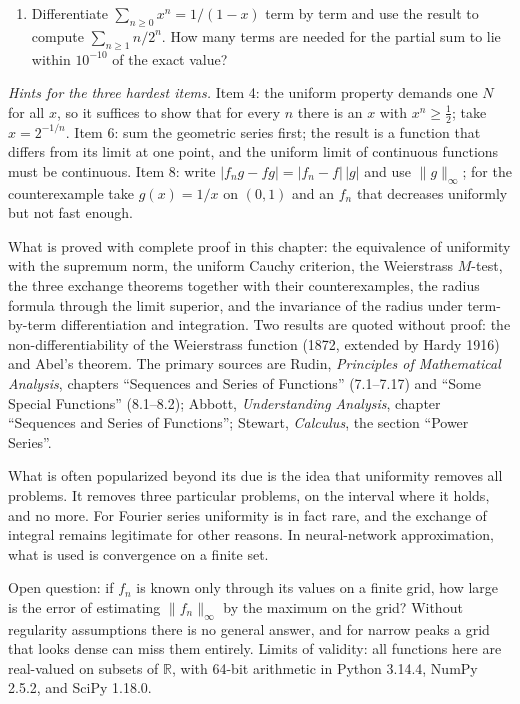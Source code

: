 \begin{latihan}
\begin{enumerate}
\item Differentiate $\sum_{n\ge0}x^n=1/(1-x)$ term by term and use the result
      to compute $\sum_{n\ge1}n/2^n$. How many terms are needed for the
      partial sum to lie within $10^{-10}$ of the exact value?
\end{enumerate}

\noindent\emph{Hints for the three hardest items.} Item 4: the uniform property
demands one $N$ for all $x$, so it suffices to show that for every $n$
there is an $x$ with $x^n\ge\tfrac12$; take $x=2^{-1/n}$. Item 6: sum the geometric
series first; the result is a function that differs from its limit at one point,
and the uniform limit of continuous functions must be continuous. Item 8: write
$|f_ng-fg|=|f_n-f|\,|g|$ and use $\|g\|_\infty$; for the counterexample
take $g(x)=1/x$ on $(0,1)$ and an $f_n$ that decreases uniformly but not
fast enough.
\end{latihan}

\begin{untukpeneliti}
What is proved with complete proof in this chapter: the equivalence of uniformity with the
supremum norm, the uniform Cauchy criterion, the Weierstrass $M$-test, the three exchange
theorems together with their counterexamples, the radius formula through the limit superior, and
the invariance of the radius under term-by-term differentiation and integration. Two results are
quoted without proof: the non-differentiability of the Weierstrass function (1872, extended
by Hardy 1916) and Abel's theorem. The primary sources are Rudin, \emph{Principles of
Mathematical Analysis}, chapters ``Sequences and Series of Functions'' (7.1--7.17) and
``Some Special Functions'' (8.1--8.2); Abbott, \emph{Understanding Analysis}, chapter
``Sequences and Series of Functions''; Stewart, \emph{Calculus}, the section ``Power
Series''.

What is often popularized beyond its due is the idea that uniformity removes all
problems. It removes three particular problems, on the interval where it holds, and
no more. For Fourier series uniformity is in fact rare, and the exchange of
integral remains legitimate for other reasons. In neural-network approximation, what is used is
convergence on a finite set.

Open question: if $f_n$ is known only through its values on a finite grid, how large
is the error of estimating $\|f_n\|_\infty$ by the maximum on the grid? Without
regularity assumptions there is no general answer, and for narrow peaks a grid that looks
dense can miss them entirely. Limits of validity: all functions here are
real-valued on subsets of $\mathbb{R}$, with 64-bit arithmetic in
Python 3.14.4, NumPy 2.5.2, and SciPy 1.18.0.
\end{untukpeneliti}

